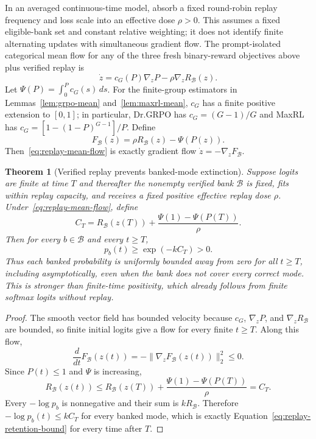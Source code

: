 \documentclass{article}
\newcommand{\1}{\mathbf 1}
\newtheorem{theorem}[lemma]{Theorem}
\theoremstyle{remark}
\theoremstyle{definition}
\theoremstyle{plain}
\begin{document}
In an averaged continuous-time model, absorb a fixed round-robin replay
frequency and loss scale into an effective dose $\rho>0$. This assumes a
fixed eligible-bank set and constant relative weighting; it does not identify
finite alternating updates with simultaneous gradient flow. The prompt-isolated categorical mean flow for any of the three fresh
binary-reward objectives above plus verified replay is
\begin{equation}
  \dot z
  =c_G(P)\nabla_zP-\rho\nabla_zR_{\mathcal B}(z).
  \label{eq:replay-mean-flow}
\end{equation}
Let $\Psi(P)=\int_0^P c_G(s)\,ds$. For the finite-group estimators in Lemmas~\ref{lem:grpo-mean}
and~\ref{lem:maxrl-mean}, $c_G$ has a finite positive extension to $[0,1]$;
in particular, Dr.GRPO has $c_G=(G-1)/G$ and MaxRL has
$c_G=[1-(1-P)^{G-1}]/P$. Define
\begin{equation}
  F_{\mathcal B}(z)=\rho R_{\mathcal B}(z)-\Psi(P(z)).
  \label{eq:replay-potential}
\end{equation}
Then~\eqref{eq:replay-mean-flow} is exactly gradient flow
$\dot z=-\nabla_zF_{\mathcal B}$.

\begin{theorem}[Verified replay prevents banked-mode extinction]
\label{thm:replay-retention}
Suppose logits are finite at time $T$ and thereafter the nonempty verified
bank $\mathcal B$ is fixed, fits within replay capacity, and receives a
fixed positive effective replay dose $\rho$. Under~\eqref{eq:replay-mean-flow}, define
\[
  C_T
  =R_{\mathcal B}(z(T))
   +\frac{\Psi(1)-\Psi(P(T))}{\rho}.
\]
Then for every $b\in\mathcal B$ and every $t\ge T$,
\begin{equation}
  p_b(t)\ge \exp(-kC_T)>0.
  \label{eq:replay-retention-bound}
\end{equation}
Thus each banked probability is uniformly bounded away from zero for all
$t\ge T$, including asymptotically, even when the bank does not cover every
correct mode. This is stronger than finite-time positivity, which already
follows from finite softmax logits without replay.
\end{theorem}

\begin{proof}
The smooth vector field has bounded velocity because $c_G$,
$\nabla_zP$, and $\nabla_zR_{\mathcal B}$ are bounded, so finite initial
logits give a flow for every finite $t\ge T$. Along this flow,
\[
  \frac{d}{dt}F_{\mathcal B}(z(t))
  =-\lVert\nabla_zF_{\mathcal B}(z(t))\rVert_2^2\le0.
\]
Since $P(t)\le1$ and $\Psi$ is increasing,
\[
  R_{\mathcal B}(z(t))
  \le R_{\mathcal B}(z(T))
     +\frac{\Psi(1)-\Psi(P(T))}{\rho}
  =C_T.
\]
Every $-\log p_b$ is nonnegative and their sum is
$kR_{\mathcal B}$. Therefore
$-\log p_b(t)\le kC_T$ for every banked mode, which is exactly
Equation~\eqref{eq:replay-retention-bound} for every time after $T$.
\end{proof}
\end{document}
